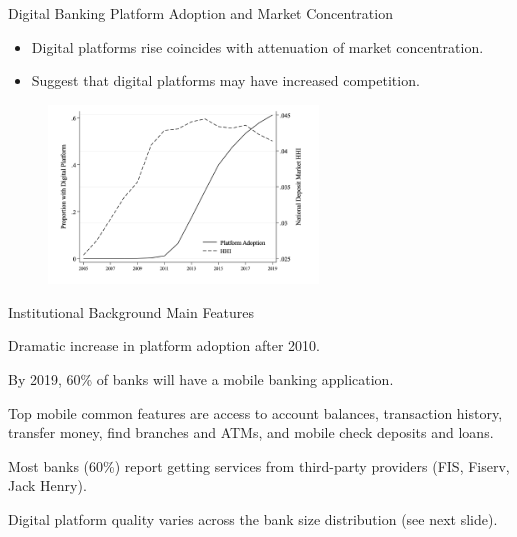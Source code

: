 \documentclass[notes,10pt, aspectratio=169]{beamer}
\newenvironment{wideitemize}{\itemize\addtolength{\itemsep}{10pt}}{\enditemize}
\begin{document}
\begin{frame}{Digital Banking Platform Adoption and Market Concentration}

    \begin{itemize}
        \item Digital platforms rise coincides with attenuation of market concentration.
        \item Suggest that digital platforms may have increased competition.
    \end{itemize}

    \begin{figure}
        \centering
        \includegraphics[width=0.64\textwidth]{imgs/fig1.png}
    \end{figure}

\end{frame}

\begin{frame}{Institutional Background Main Features}

    \begin{wideitemize}

        \item Dramatic increase in platform adoption after 2010.

        \item By 2019, 60\% of banks will have a mobile banking application.
        
        \item Top mobile common features are access to account balances, transaction history, transfer money, find branches and ATMs, and mobile check deposits and loans. 

        \item Most banks (60\%) report getting services from third-party providers (FIS, Fiserv, Jack Henry).
        
        \item Digital platform quality varies across the bank size distribution (see next slide).


    \end{wideitemize}

\end{frame}
\end{document}
